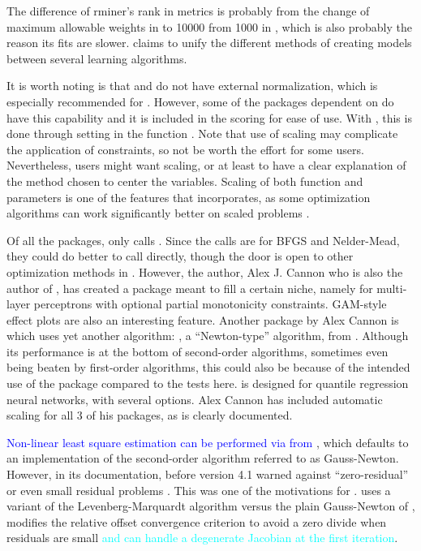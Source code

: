 The difference of rminer's rank in metrics is probably from the change
of maximum allowable weights in  to 10000 from 1000 in
, which is also probably the reason its fits are slower.
 \citep{R-traineR} claims to unify the different
methods of creating models between several learning algorithms.

It is worth noting is that  and  do not have
external normalization, which is especially recommended for
. However, some of the packages dependent on  do
have this capability and it is included in the scoring for ease of use.
With , this is done through setting 
in the function . Note that use of scaling may
complicate the application of constraints, so not be worth the effort
for some users. Nevertheless, users might want scaling, or at least to
have a clear explanation of the method chosen to center the variables.
Scaling of both function and parameters is one of the features that
 \citep{R-optimx} incorporates, as some optimization
algorithms can work significantly better on scaled problems
\citep{Nash-nlpor14}.

Of all the packages, only  \citep{R-monmlp} calls
. Since the calls are for BFGS and Nelder-Mead, they could
do better to call  directly, though the door is open to
other optimization methods in . However, the author, Alex J.
Cannon who is also the author of , has created a package
meant to fill a certain niche, namely for multi-layer perceptrons with
optional partial monotonicity constraints. GAM-style effect plots are
also an interesting feature. Another package by Alex Cannon is
 \citep{R-qrnn} which uses yet another algorithm: ,
a ``Newton-type'' algorithm, from . Although its performance
is at the bottom of second-order algorithms, sometimes even being beaten
by first-order algorithms, this could also be because of the intended
use of the package compared to the tests here.  is designed
for quantile regression neural networks, with several options. Alex
Cannon has included automatic scaling for all 3 of his packages, as is
clearly documented.

\textcolor{blue}{Non-linear least square estimation can be performed via  from },
which defaults to an implementation of the second-order algorithm
referred to as Gauss-Newton. However, in its documentation, 
before version 4.1 warned against ``zero-residual'' or even small
residual problems \citep[Section 6.4.1]{Nash-nlpor14}. This was one of
the motivations for  \citep{R-nlsr}.  uses a
variant \citep{jn77ima} of the Levenberg-Marquardt algorithm versus the
plain Gauss-Newton of , modifies the relative offset
convergence criterion to avoid a zero divide when residuals are small
\textcolor{cyan}{and can handle a degenerate Jacobian at the
first iteration}.

